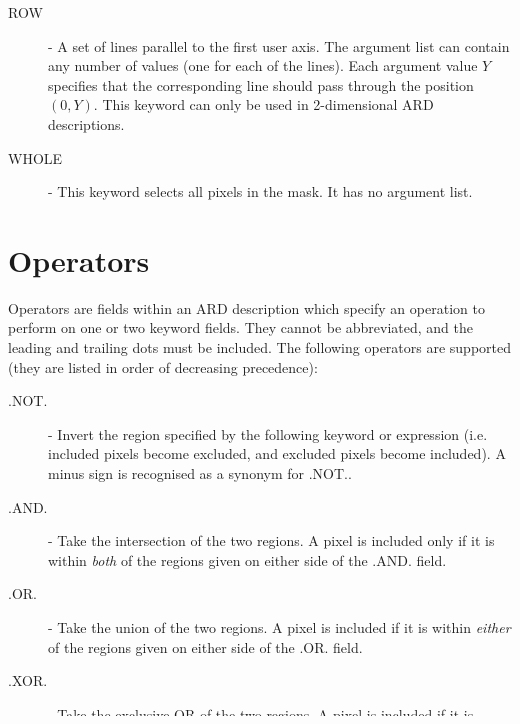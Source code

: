 \begin{description}
\item [\label{KEY:ROW}ROW] - A set of lines parallel to the first user axis. 
The argument list can contain any number of values (one for each of the
lines). Each argument value $Y$ specifies that the corresponding line
should pass through the position $(0,Y)$. This keyword can only be used
in 2-dimensional ARD descriptions.

\item [\label{KEY:WHO}WHOLE] - This keyword selects all pixels in the mask. It 
has no argument list. 

\end{description}

\section{\label{SEC:OPER}Operators}
Operators are fields within an ARD description which specify an operation to
perform on one or two keyword fields. They cannot be abbreviated, and the
leading and trailing dots must be included. The following operators are
supported (they are listed in order of decreasing precedence): 

\begin{description}

\item [\label{OP:NOT}.NOT.] - Invert the region specified by the following keyword or
expression (i.e. included pixels become excluded, and excluded pixels become
included). A minus sign is recognised as a synonym for .NOT..

\item [\label{OP:AND}.AND.] - Take the intersection of the two regions. A pixel is included
only if it is within {\em both} of the regions given on either side of the
.AND. field. 

\item [\label{OP:OR}.OR.] - Take the union of the two regions. A pixel is included if it is
within {\em either} of the regions given on either side of the .OR. field. 

\item [\label{OP:XOR}.XOR.] - Take the exclusive OR of the two regions. A pixel is included if
it is within one, but not both, of the regions given on either side of the .XOR.
field. 

\item [\label{OP:EQV}.EQV.] - Take the equivalence of the two regions. A pixel is included if
it is within {\em both} of the regions given on either side of the .EQV. field,
or if it is within {\em neither}. 

\end{description}

